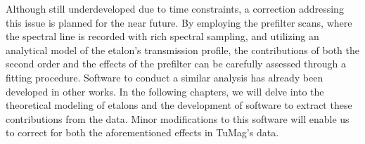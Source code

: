 Although still underdeveloped due to time constraints, a correction addressing this issue is planned for the near future. By employing the prefilter scans, where the spectral line is recorded with rich spectral sampling, and utilizing an analytical model of the etalon's transmission profile, the contributions of both the second order and the effects of the prefilter can be carefully assessed through a fitting procedure. Software to conduct a similar analysis has already been developed in other works. In the following chapters, we will delve into the theoretical modeling of etalons and the development of software to extract these contributions from the data. Minor modifications to this software will enable us to correct for both the aforementioned effects in TuMag's data.

